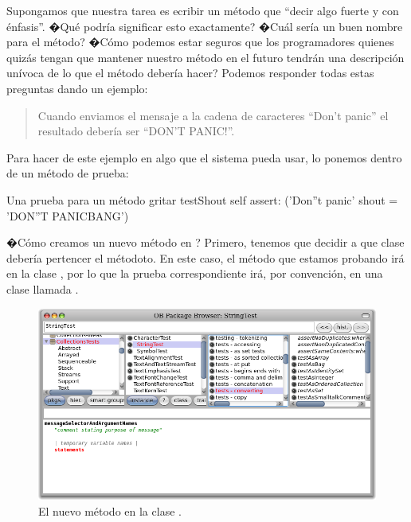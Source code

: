 \documentclass[a4paper,10pt,twoside]{book}
\begin{document}
Supongamos que nuestra tarea es ecribir un m\'etodo que ``decir algo fuerte y con \'enfasis''. �Qu\'e podr\'ia significar esto exactamente? �Cu\'al ser\'ia un buen nombre para el m\'etodo? �C\'omo podemos estar seguros que los programadores quienes quiz\'as tengan que mantener nuestro m\'etodo en el futuro tendr\'an una descripci\'on un\'ivoca de lo que el m\'etodo deber\'ia hacer? Podemos responder todas estas preguntas dando un ejemplo:

\begin{quote}
Cuando enviamos el mensaje  a la cadena de caracteres ``Don't panic'' el resultado deber\'ia ser ``DON'T PANIC!''.
\end{quote}

\noindent
Para hacer de este ejemplo en algo que el sistema pueda usar, lo ponemos dentro de un m\'etodo de prueba:

\begin{method}[testShout]{Una prueba para un m\'etodo gritar}
testShout
	self assert: ('Don''t panic' shout = 'DON''T PANICBANG')
\end{method} %

�C\'omo creamos un nuevo m\'etodo en \pharo? Primero, tenemos que decidir a que clase deber\'ia pertencer el m\'etodoto.
En este caso, el m\'etodo  que estamos probando ir\'a en la clase , por lo que la prueba correspondiente ir\'a, por convenci\'on, en una clase llamada .

\begin{figure}[hbt]
\centerline {\includegraphics[width=\textwidth]{StringTest-newMethodTemplate}}
\caption{El nuevo m\'etodo en la clase .
}
\end{figure}
\end{document}

